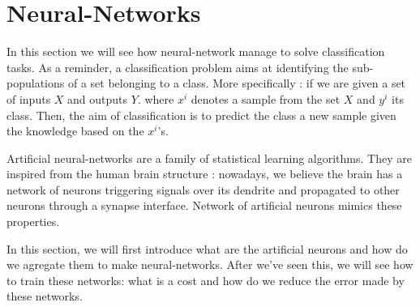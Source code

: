 
\section{Neural-Networks}
\label{sec:neural_networks}

	In this section we will see how neural-network manage to solve classification tasks. As a reminder, a classification problem aims at identifying the sub-populations of a set belonging to a class. More specifically : if we are given a set of inputs $X$ and outputs $Y$. where $x^i$ denotes a sample from the set $X$ and $y^i$ its class. Then, the aim of classification is to predict the class a new sample given the knowledge based on the $x^i$'s.

	Artificial neural-networks are a family of statistical learning algorithms. They are inspired from the human brain structure : nowadays, we believe the brain has a network of neurons triggering signals over its dendrite and propagated to other neurons through a synapse interface. Network of artificial neurons mimics these properties.


	In this section, we will first introduce what are the artificial neurons and how do we agregate them to make neural-networks. After we've seen this, we will see how to train these networks: what is a cost and how do we reduce the error made by these networks.




